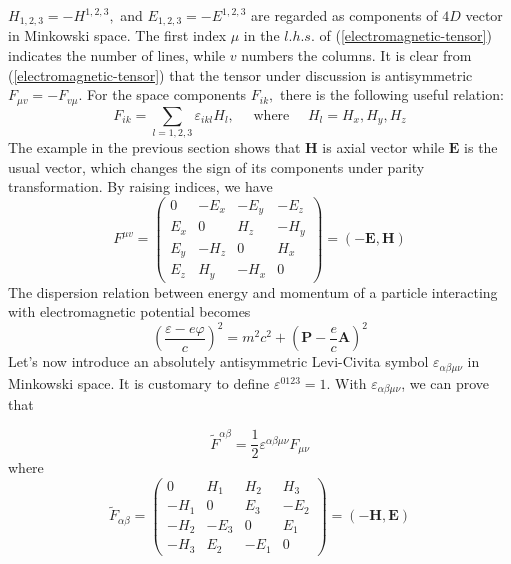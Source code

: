 $H_{1,2,3}=-H^{1,2,3},$ and $E_{1,2,3}=-E^{1,2,3}$ are regarded as components of $4 D$ vector in Minkowski space. The first index $\mu$ in the $l . h . s .$ of (\ref{electromagnetic-tensor}) indicates the number of lines, while $v$ numbers the columns. It is clear from (\ref{electromagnetic-tensor}) that the tensor under discussion is antisymmetric $F_{\mu v}=-F_{v \mu} .$ For the space components $F_{i k},$ there is the following useful relation:
\begin{equation}
F_{i k}=\sum_{l=1,2,3} \varepsilon_{i k l} H_{l}, \quad \text { where } \quad H_{l}=H_{x}, H_{y}, H_{z}
\end{equation}
The example in the previous section shows that $\mathbf{H}$ is axial vector while $\mathbf{E}$ is the usual vector, which changes the sign of its components under parity transformation. By raising indices, we have
\begin{equation}
F^{\mu v}=\left(\begin{array}{cccc}
{0} & {-E_{x}} & {-E_{y}} & {-E_{z}} \\
{E_{x}} & {0} & {H_{z}} & {-H_{y}} \\
{E_{y}} & {-H_{z}} & {0} & {H_{x}} \\
{E_{z}} & {H_{y}} & {-H_{x}} & {0}
\end{array}\right)=(-\mathbf{E}, \mathbf{H})
\end{equation}
The dispersion relation between energy and momentum of a particle
interacting with electromagnetic potential becomes
\begin{equation}
\left(\frac{\varepsilon-e \varphi}{c}\right)^{2}=m^{2} c^{2}+\left(\mathbf{P}-\frac{e}{c} \mathbf{A}\right)^{2}
\end{equation}
Let's now introduce an absolutely antisymmetric Levi-Civita symbol $\varepsilon_{\alpha \beta \mu \nu}$ in Minkowski space. It is customary to define $\varepsilon^{\mathrm{0123}}=1$. With $\varepsilon_{\alpha \beta \mu \nu}$, we can prove that
\begin{qt}
    \begin{equation}
\tilde{F}^{\alpha \beta}=\frac{1}{2} \varepsilon^{\alpha \beta \mu \nu} F_{\mu \nu}
\end{equation}
where
\begin{equation}
\tilde{F}_{\alpha \beta}=\left(\begin{array}{cccc}
{0} & {H_{1}} & {H_{2}} & {H_{3}} \\
{-H_{1}} & {0} & {E_{3}} & {-E_{2}} \\
{-H_{2}} & {-E_{3}} & {0} & {E_{1}} \\
{-H_{3}} & {E_{2}} & {-E_{1}} & {0}
\end{array}\right)=(\mathbf{-H}, \mathbf{E})
\end{equation}
\end{qt}